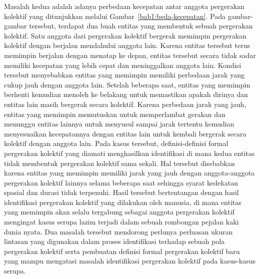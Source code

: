 Masalah kedua adalah adanya perbedaan kecepatan antar anggota pergerakan kolektif yang ditunjukkan melalui Gambar~\ref{bab1:beda-kecepatan}. Pada gambar-gambar tersebut, terdapat dua buah entitas yang membentuk sebuah pergerakan kolektif. Satu anggota dari pergerakan kolektif bergerak memimpin pergerakan kolektif dengan berjalan mendahului anggota lain. Karena entitas tersebut terus memimpin berjalan dengan menatap ke depan, entitas tersebut secara tidak sadar memiliki kecepatan yang lebih cepat dan meninggalkan anggota lain. Kondisi tersebut menyebabkan entitas yang memimpin memiliki perbedaan jarak yang cukup jauh dengan anggota lain. Setelah beberapa saat, entitas yang memimpin berhenti kemudian menoleh ke belakang untuk memastikan apakah dirinya dan entitas lain masih bergerak secara kolektif. Karena perbedaan jarak yang jauh, entitas yang memimpin memutuskan untuk memperlambat gerakan dan menunggu entitas lainnya untuk menyusul sampai jarak tertentu kemudian menyesuaikan kecepatannya dengan entitas lain untuk kembali bergerak secara kolektif dengan anggota lain. Pada kasus tersebut, definisi-definisi formal pergerakan kolektif yang diamati menghasilkan identifikasi di mana kedua entitas tidak membentuk pergerakan kolektif sama sekali. Hal tersebut disebabkan karena entitas yang memimpin memiliki jarak yang jauh dengan anggota-anggota pergerakan kolektif lainnya selama beberapa saat sehingga syarat kedekatan spasial dan durasi tidak terpenuhi. Hasil tersebut bertentangan dengan hasil identifikasi pergerakan kolektif yang dilakukan oleh manusia, di mana entitas yang memimpin akan selalu tergabung sebagai anggota pergerakan kolektif mengingat kasus serupa lazim terjadi dalam sebuah rombongan pejalan kaki dunia nyata. Dua masalah tersebut mendorong perlunya perluasan ukuran lintasan yang digunakan dalam proses identifikasi terhadap sebuah pola pergerakan kolektif serta pembuatan definisi formal pergerakan kolektif baru yang mampu mengatasi masalah identifikasi pergerakan kolektif pada kasus-kasus serupa. 

